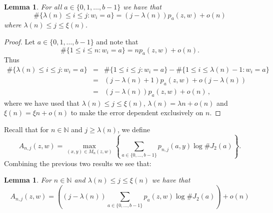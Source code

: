 \documentclass[12pt]{article}
\newtheorem{lemma}[definition]{Lemma}
\theoremstyle{remark}
\numberwithin{equation}{section}
\renewcommand{\Bbb}[1]{\mathbb{#1}}
\newcommand{\N}{{\Bbb N}}         %
\newcommand{\0}{\mathbf{0}}
\begin{document}
\begin{lemma}\label{shiftedfrequency}
For all $a \in \{0,1,\dots, b-1\}$ we have that   
$$\#\{\lambda(n) \leq i \leq j : w_{i}=a \}=(j-\lambda(n))p_a(z,w)+\mathit{o}(n)$$ 
where $\lambda(n)\leq j\leq \xi(n)$.
\end{lemma}
\begin{proof}
Let $a \in \{0,1,\dots,b-1\}$ and note that 
\[\#\{1\leq i\leq n:w_i=a\}=np_a(z,w)+\mathit{o}(n).\] Thus
\begin{eqnarray*}
\#\{\lambda(n) \leq i \leq j : w_{i}=a \}&=&\#\{1\leq i\leq j:w_i=a\}-\#\{1\leq i \leq \lambda(n)-1:w_i=a\}\\
&=&(j-\lambda(n)+1)p_a(z,w)+\mathit{o}(j-\lambda(n))
\\
&=&(j-\lambda(n))p_a(z,w)+\mathit{o}(n)\, ,
\end{eqnarray*}
where we have used that $\lambda(n)\leq j \leq \xi(n)$, $\lambda(n)=\lambda n+\mathit{o}(n)$ and $\xi(n)=\xi n+\mathit{o}(n)$ to make the error dependent exclusively on $n$.
\end{proof}
Recall that for $n \in \N$ and $j \geq \lambda(n)$, we define
\begin{equation*}
    A_{n,j}(z,w)= \max_{(x,y) \in M_{n}(z,w)} \left\{ \sum_{a \in \{0, \dots , b-1\}} p_{n,j}(a, y) \log\#J_{2}(a) \right\}.
\end{equation*} 
Combining the previous two results we see that:
\begin{lemma}\label{keybound}
For $n\in\N$ and $\lambda(n)\leq j\leq\xi(n)$ we have that
$$A_{n,j}(z,w)=\left((j-\lambda(n))\sum_{a\in \{0,\ldots, b-1\}} p_a(z,w)\log\#J_2(a)\right)+\mathit{o}(n)$$
\end{lemma}
\end{document}
